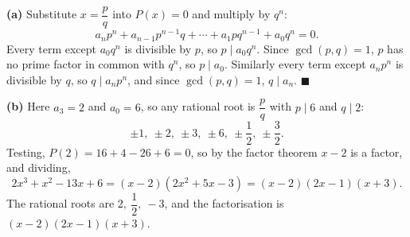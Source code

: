 \textbf{(a)} Substitute $x=\dfrac pq$ into $P(x)=0$ and multiply by $q^n$:
\[a_np^n+a_{n-1}p^{n-1}q+\cdots+a_1pq^{n-1}+a_0q^n=0.\]
Every term except $a_0q^n$ is divisible by $p$, so $p\mid a_0q^n$. Since $\gcd(p,q)=1$, $p$ has no prime factor in common with $q^n$, so $p\mid a_0$. Similarly every term except $a_np^n$ is divisible by $q$, so $q\mid a_np^n$, and since $\gcd(p,q)=1$, $q\mid a_n$. $\blacksquare$

\textbf{(b)} Here $a_3=2$ and $a_0=6$, so any rational root is $\dfrac pq$ with $p\mid6$ and $q\mid2$:
\[\pm1,\ \pm2,\ \pm3,\ \pm6,\ \pm\dfrac12,\ \pm\dfrac32.\]
Testing, $P(2)=16+4-26+6=0$, so by the factor theorem $x-2$ is a factor, and dividing,
\[2x^3+x^2-13x+6=(x-2)\left(2x^2+5x-3\right)=(x-2)(2x-1)(x+3).\]
The rational roots are $\boxed{2,\ \dfrac12,\ -3}$, and the factorisation is $\boxed{(x-2)(2x-1)(x+3)}$.
